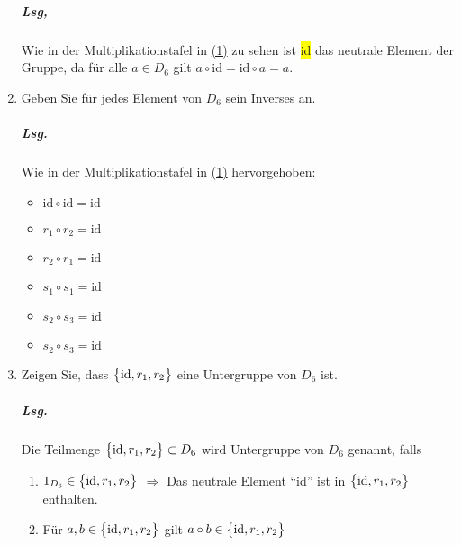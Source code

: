 \documentclass{scrreprt}
\begin{document}
\begin{enumerate}[(1)]
  \subparagraph{Lsg,} Wie in der Multiplikationstafel in \hyperref[sec:2_1]{(1)}
  zu sehen ist \colorbox{yellow}{id} das neutrale Element der Gruppe, da für
  alle $a \in D_6$ gilt $a \circ \text{id} = \text{id} \circ a = a$.

\item Geben Sie für jedes Element von $D_6$ sein Inverses an.

  \subparagraph{Lsg.} Wie in der Multiplikationstafel in \hyperref[sec:2_1]{(1)}
  \colorbox{green!40}{hervorgehoben:}
  \begin{multicols}{2}
    \begin{itemize}
    \item $\text{id} \circ \text{id} = \text{id}$
    \item $r_1 \circ r_2 = \text{id}$
    \item $r_2 \circ r_1 = \text{id}$
    \item $s_1 \circ s_1 = \text{id}$
    \item $s_2 \circ s_3 = \text{id}$
    \item $s_2 \circ s_3 = \text{id}$
    \end{itemize}
  \end{multicols}

\item Zeigen Sie, dass $\qty\big{\text{id}, r_1, r_2}$ eine Untergruppe von
  $D_6$ ist.

  \subparagraph{Lsg.} Die Teilmenge $\qty\big{\text{id}, r_1, r_2} \subset D_6$
  wird Untergruppe von $D_6$ genannt, falls
  \begin{enumerate}[1)]
  \item $1_{D_6} \in \qty\big{\text{id}, r_1, r_2}$
    $\Rightarrow$ Das neutrale Element ``id'' ist in
    $\qty\big{\text{id}, r_1, r_2}$ enthalten.

  \item Für $a, b \in \qty\big{\text{id}, r_1, r_2}$ gilt
    $a \circ b \in \qty\big{\text{id}, r_1, r_2}$


\end{enumerate}
\end{enumerate}
\end{document}
